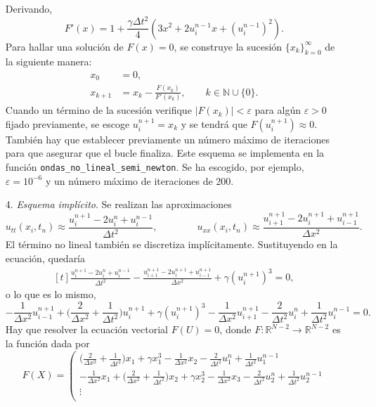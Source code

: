 \documentclass[a4paper, 11pt, oneside]{report}
\begin{document}
\begin{itemize}
    Derivando,
    \[F'(x) = 1+\frac{\gamma \Delta t^2}{4}(3x^2+2u_i^{n-1}x+(u_i^{n-1})^2).\]
    Para hallar una solución de $F(x) = 0$, se construye la sucesión $\{x_k\}_{k=0}^\infty$ de la siguiente manera:
    \begin{align*}
        x_0 &= 0, \\
        x_{k+1} &= x_k - \frac{F(x_k)}{F'(x_k)}, \qquad k \in \mathbb{N} \cup \{0\}.
    \end{align*}
    Cuando un término de la sucesión verifique $|F(x_k)| < \varepsilon$ para algún $\varepsilon > 0$ fijado previamente, se escoge $u_i^{n+1} = x_k$ y se tendrá que $F(u_i^{n+1}) \approx 0$. También hay que establecer previamente un número máximo de iteraciones para que asegurar que el bucle finaliza. Este esquema se implementa en la función \texttt{ondas\_no\_lineal\_semi\_newton}. Se ha escogido, por ejemplo, $\varepsilon = 10^{-6}$ y un número máximo de iteraciones de 200.
    \item[4.] \emph{Esquema implícito}. Se realizan las aproximaciones 
    \[u_{tt}(x_i,t_n) \approx \frac{u_i^{n+1}-2u_i^n + u_i^{n-1}}{\Delta t^2}, \qquad \qquad u_{xx}(x_i,t_n) \approx \frac{u_{i+1}^{n+1} - 2u_i^{n+1} + u_{i-1}^{n+1}}{\Delta x^2}.\]
    El término no lineal también se discretiza implícitamente. Sustituyendo en la ecuación, quedaría
    \[
    \begin{aligned}[t]
        \frac{u_i^{n+1}-2u_i^n + u_i^{n-1}}{\Delta t^2}-\frac{u_{i+1}^{n+1} - 2u_i^{n+1} + u_{i-1}^{n+1}}{\Delta x^2}+\gamma (u_i^{n+1})^3 = 0,
    \end{aligned}
    \]
    o lo que es lo mismo,
    \[-\frac{1}{\Delta x^2}u_{i-1}^{n+1} + \bigl(\frac{2}{\Delta x^2}+\frac{1}{\Delta t^2}\bigr)u_i^{n+1} + \gamma(u_i^{n+1})^3-\frac{1}{\Delta x^2}u_{i+1}^{n+1} - \frac{2}{\Delta t^2}u_i^n + \frac{1}{\Delta t^2}u_i^{n-1} = 0.\]
    Hay que resolver la ecuación vectorial $F(U) = 0$, donde $F \colon \mathbb{R}^{N-2} \to \mathbb{R}^{N-2}$ es la función dada por
    \[F(X) = \left(\begin{array}{c}
        \bigl(\frac{2}{\Delta x^2}+\frac{1}{\Delta t^2}\bigr)x_1 + \gamma x_1^3-\frac{1}{\Delta x^2}x_2 - \frac{2}{\Delta t^2}u_1^n + \frac{1}{\Delta t^2}u_1^{n-1} \\[5pt]
        -\frac{1}{\Delta x^2}x_1+\bigl(\frac{2}{\Delta x^2}+\frac{1}{\Delta t^2}\bigr)x_2 + \gamma x_2^3-\frac{1}{\Delta x^2}x_3 - \frac{2}{\Delta t^2}u_2^n + \frac{1}{\Delta t^2}u_2^{n-1} \\[5pt]
        \vdots \\[5pt]

\end{array}\]
\end{itemize}
\end{document}
